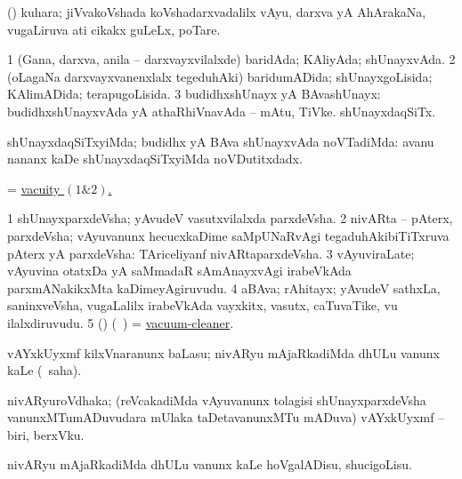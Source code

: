 \bentry
{} 
\gl{\nA}
\expl{}
\bmng
 (\jiVvi) kuhara; jiVvakoVshada koVshadarxvadalilx vAyu, darxva yA AhArakaNa, \mo vugaLiruva ati cikakx guLeLx, poTare. 
\emng
\eentry

\bentry
{} 
\gl{\gu}
\expl{}
\bmng
\bnum
\num{1} (Gana, darxva, anila -- darxvayxvilalxde) baridAda; KAliyAda; shUnayxvAda. 
\num{2} (oLagaNa darxvayxvanenxlalx tegeduhAki) baridumADida; shUnayxgoLisida; KAlimADida; terapugoLisida. 
\num{3} budidhxshUnayx yA BAvashUnayx:  budidhxshUnayxvAda yA athaRhiVnavAda -- mAtu, TiVke.  shUnayxdaqSiTx. 
\enum
\emng
\eentry

\bentry
{} 
\gl{\kirxvi}
\expl{}
\bmng
 shUnayxdaqSiTxyiMda; budidhx yA BAva shUnayxvAda noVTadiMda:  avanu nananx kaDe shUnayxdaqSiTxyiMda noVDutitxdadx. 
\emng
\eentry

\bentry
{} 
\gl{\nA}
\expl{}
\bmng
 = \hyperlink{vacuity}{vacuity \((1 \& 2)\).} 
\emng
\eentry

\bentry
{} 
\gl{\nA}
\bmng
\bnum
\num{1} shUnayxparxdeVsha; yAvudeV vasutxvilalxda parxdeVsha. 
\num{2} nivARta -- pAterx, parxdeVsha; vAyuvanunx hecucxkaDime saMpUNaRvAgi tegaduhAkibiTiTxruva pAterx yA parxdeVsha:  TAriceliyanf nivARtaparxdeVsha. 
\num{3} vAyuviraLate; vAyuvina otatxDa yA saMmadaR sAmAnayxvAgi irabeVkAda parxmANakikxMta kaDimeyAgiruvudu. 
\num{4} aBAva; rAhitayx; yAvudeV sathxLa, saninxveVsha, \mo vugaLalilx irabeVkAda vayxkitx, vasutx, caTuvaTike, \mo vu ilalxdiruvudu. 
\num{5} (\AmA) (\bava\ ) = \hyperlink{vacuum-cleaner}{vacuum-cleaner}. 
\enum
\emng
\eentry

\bentry
{} 
\gl{\sakirx}
\expl{}
\bmng
 vAYxkUyxmf kilxVnaranunx baLasu; nivARyu mAjaRkadiMda dhULu \mo vanunx kaLe (\akirx\ saha). 
\emng
\eentry

\bentry
{}
\gl{\nA}
\expl{}
\bmng
 nivARyuroVdhaka; (reVcakadiMda vAyuvanunx tolagisi shUnayxparxdeVsha vanunxMTumADuvudara mUlaka taDetavanunxMTu mADuva) vAYxkUyxmf -- biri, berxVku. 
\emng
\eentry

\bentry
{} 
\gl{\sakirx}
\expl{}
\bmng
 nivARyu mAjaRkadiMda dhULu \mo vanunx kaLe hoVgalADisu, shucigoLisu. 
\emng
\eentry

